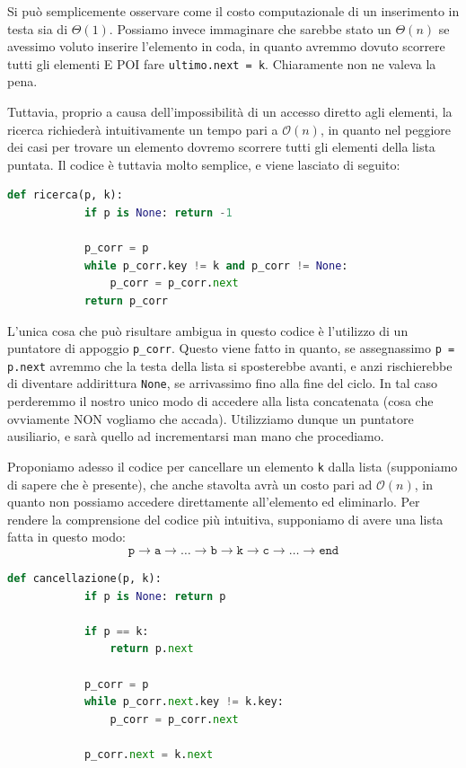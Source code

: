 \documentclass[12pt]{report}
\begin{document}
    Si può semplicemente osservare come il costo computazionale di un inserimento in testa sia di $\Theta(1)$. Possiamo invece immaginare che sarebbe stato un $\Theta(n)$ se avessimo voluto inserire l'elemento in coda, in quanto avremmo dovuto scorrere tutti gli elementi E POI fare \texttt{ultimo.next = k}. Chiaramente non ne valeva la pena.
    
    Tuttavia, proprio a causa dell'impossibilità di un accesso diretto agli elementi, la ricerca richiederà intuitivamente un tempo pari a $\mathcal{O}(n)$, in quanto nel peggiore dei casi per trovare un elemento dovremo scorrere tutti gli elementi della lista puntata. Il codice è tuttavia molto semplice, e viene lasciato di seguito:
    
    \begin{lstlisting}[language=Python, caption={Ricerca in una lista concatenata semplice}]
    	def ricerca(p, k):
    		if p is None: return -1
    		
    		p_corr = p
    		while p_corr.key != k and p_corr != None:
    			p_corr = p_corr.next
    		return p_corr
    \end{lstlisting}
    
    L'unica cosa che può risultare ambigua in questo codice è l'utilizzo di un puntatore di appoggio \texttt{p\_corr}. Questo viene fatto in quanto, se assegnassimo \texttt{p = p.next} avremmo che la testa della lista si sposterebbe avanti, e anzi rischierebbe di diventare addirittura \texttt{None}, se arrivassimo fino alla fine del ciclo. In tal caso perderemmo il nostro unico modo di accedere alla lista concatenata (cosa che ovviamente NON vogliamo che accada). Utilizziamo dunque un puntatore ausiliario, e sarà quello ad incrementarsi man mano che procediamo.
    
    Proponiamo adesso il codice per cancellare un elemento \texttt{k} dalla lista (supponiamo di sapere che è presente), che anche stavolta avrà un costo pari ad $\mathcal{O}(n)$, in quanto non possiamo accedere direttamente all'elemento ed eliminarlo. Per rendere la comprensione del codice più intuitiva, supponiamo di avere una lista fatta in questo modo: 
    \[
    \texttt{p} \rightarrow \texttt{a} \rightarrow \dots \rightarrow \texttt{b} \rightarrow \texttt{k} \rightarrow \texttt{c} \rightarrow \dots \rightarrow \texttt{end}
    \]
    
    \begin{lstlisting}[language=Python, caption={Cancellazione da una lista concatenata semplice}]
    	def cancellazione(p, k):
    		if p is None: return p
    		
    		if p == k:
    			return p.next
    		
    		p_corr = p
    		while p_corr.next.key != k.key:
    			p_corr = p_corr.next
    		
    		p_corr.next = k.next
    \end{lstlisting}
    
\end{document}
